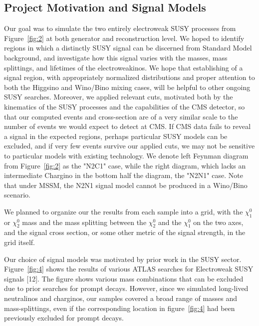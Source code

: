 \documentclass{article}
\begin{document}
\subsection{Project Motivation and Signal Models}
Our goal was to simulate the two entirely electroweak SUSY processes from Figure~\ref{fig:2} at both generator and reconstruction level. We hoped to identify regions in which a distinctly SUSY signal can be discerned from Standard Model background, and investigate how this signal varies with the masses, mass splittings, and lifetimes of the electroweakinos. We hope that establishing of a signal region, with appropriately normalized distributions and proper attention to both the Higgsino and Wino/Bino mixing cases, will be helpful to other ongoing SUSY searches. Moreover, we applied relevant cuts, motivated both by the kinematics of the SUSY processes and the capabilities of the CMS detector, so that our computed events and cross-section are of a very similar scale to the number of events we would expect to detect at CMS. If CMS data fails to reveal a signal in the expected regions, perhaps particular SUSY models can be excluded, and if very few events survive our applied cuts, we may not be sensitive to particular models with existing technology. We denote left Feynman diagram from Figure~\ref{fig:2} as the "N2C1" case, while the right diagram, which lacks an intermediate Chargino in the bottom half the diagram, the "N2N1" case. Note that under MSSM, the N2N1 signal model cannot be produced in a Wino/Bino scenario. 
\par We planned to organize our the results from each sample into a grid, with the $\chi^{0}_{1}$ or $\chi^{0}_{2}$ mass and the mass splitting between the $\chi^{0}_{2}$ and the  $\chi^{0}_{1}$ on the two axes, and the signal cross section, or some other metric of the signal strength, in the grid itself.
\par
Our choice of signal models was motivated by prior work in the SUSY sector. Figure~\ref{fig:4} shows the results of various ATLAS searches for Electroweak SUSY signals [12]. The figure shows various mass combinations that can be excluded due to prior searches for prompt decays. However, since we simulated long-lived neutralinos and charginos, our samples covered a broad range of masses and mass-splittings, even if the corresponding location in figure~\ref{fig:4} had been previously excluded for prompt decays.
\end{document}
